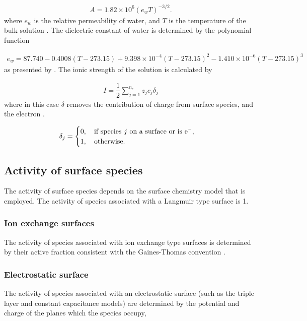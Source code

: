 \documentclass{article}
\begin{document}
\begin{align}
    A = 1.82\times10^6 \left(e_wT\right)^{-3/2}.
\end{align}
where $e_w$ is the relative permeability of water, and $T$ is the temperature of the bulk solution \cite{Davies1962}{}. The dielectric constant of water is determined by the polynomial function

\begin{align}
    e_w = 87.740 - 0.4008(T-273.15) + 9.398\times10^{-4}(T-273.15)^2 - 1.410\times10^{-6}(T-273.15)^3
\end{align}
as presented by \citet{malmberg1956dielectric}{}.
The ionic strength of the solution is calculated by

\begin{align}
    I = \dfrac{1}{2}\sum_{j=1}^{n_c} z_j c_j \delta_j
\end{align}
where in this case $\delta$ removes the contribution of charge from surface species, and the electron .

\begin{align}
\delta_j = \begin{cases}
0, \quad\text{if species $j$ on a surface or is \ce{e-}},\\
1, \quad\text{otherwise}.
\end{cases}
\end{align}

\subsection{Activity of surface species}
The activity of surface species depends on the surface chemistry model that is employed. The activity of species associated with a Langmuir type surface is 1.

\subsubsection{Ion exchange surfaces}
The activity of species associated with ion exchange type surfaces is determined by their active fraction consistent with the Gaines-Thomas convention \cite{gaines1953}{}.

\subsubsection{Electrostatic surface}
The activity of species associated with an electrostatic surface (such as the triple layer and constant capacitance models) are determined by the potential and charge of the planes which the species occupy, 
\end{document}
